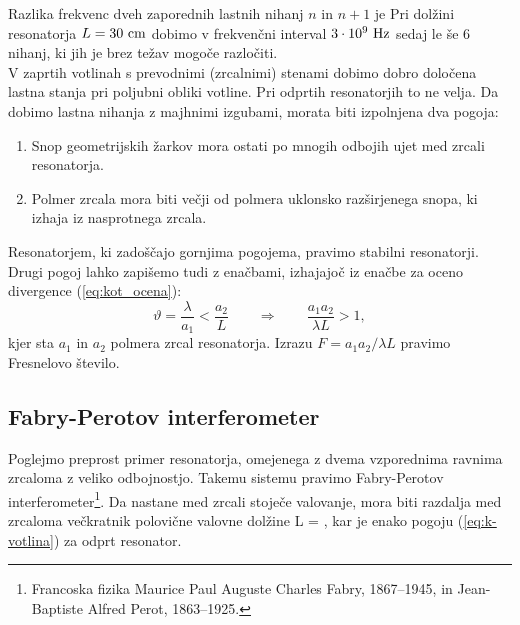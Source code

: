 \noindent
Razlika frekvenc dveh zaporednih lastnih nihanj $n$ in $n+1$ je
Pri dolžini resonatorja $L=30~\centi\metre$ dobimo v frekvenčni
interval $3\cdot10^{9}~\hertz$ sedaj le še $6$ nihanj, ki jih
je brez težav mogoče razločiti.\\

\noindent
V zaprtih votlinah s prevodnimi (zrcalnimi) stenami dobimo dobro določena lastna
stanja pri poljubni obliki votline. Pri odprtih resonatorjih to ne velja.
Da dobimo lastna nihanja z majhnimi izgubami, morata
biti izpolnjena dva pogoja:\\

\begin{enumerate} 
\item Snop geometrijskih žarkov mora ostati po mnogih odbojih ujet med zrcali resonatorja.\\
\item Polmer zrcala mora biti večji od polmera uklonsko razširjenega snopa, ki izhaja iz nasprotnega zrcala. \\
\end{enumerate}

\noindent
Resonatorjem, ki zadoščajo gornjima pogojema, pravimo stabilni resonatorji.
Drugi pogoj lahko zapišemo tudi z enačbami, izhajajoč iz enačbe za oceno divergence (\ref{eq:kot_ocena}):
\begin{equation}
\vartheta = \frac{\lambda}{a_1} < \frac{a_2}{L} \qquad \Rightarrow \qquad
\frac{a_{1}a_{2}}{\lambda L}>1,
\label{eq:Fresnelovo_stevilo}
\end{equation}
kjer sta $a_{1}$ in $a_{2}$ polmera zrcal resonatorja. Izrazu 
$
F = a_{1}a_{2}/\lambda L
$
pravimo Fresnelovo število.

\subsection*{Fabry-Perotov interferometer}
Poglejmo preprost primer resonatorja, omejenega z dvema vzporednima ravnima zrcaloma
z veliko odbojnostjo. Takemu sistemu pravimo Fabry-Perotov 
interferometer\footnote{Francoska fizika Maurice Paul Auguste Charles Fabry, 1867--1945, in 
Jean-Baptiste Alfred Perot, 1863--1925.}. 
Da nastane med zrcali stoječe valovanje, mora biti razdalja 
med zrcaloma večkratnik polovične valovne dolžine
\beq
L = ,
\eeq
kar je enako pogoju (\ref{eq:k-votlina}) za odprt resonator.\\ 

